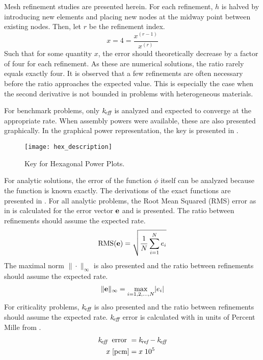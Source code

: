   Mesh refinement studies are presented herein. For each refinement, $h$ is 
  halved by introducing new elements and placing new nodes at the midway point
  between existing nodes. Then, let $r$ be the refinement index.
  \begin{equation}
    x = 4 = \frac{x^{(r-1)}}{x^{(r)}}
  \end{equation}
  Such that for some quantity $x$, the error should theoretically decrease by a
  factor of four for each refinement. As these are numerical solutions, the 
  ratio rarely equals exactly four. It is observed that a few refinements are 
  often necessary before the ratio approaches the expected value. This is 
  especially the case when the second derivative is not bounded in problems with 
  heterogeneous materials.
  
  For benchmark problems, only $k_{\!\mbox{\scriptsize \em eff}}$ is analyzed and expected to converge
  at the appropriate rate. When assembly powers were available, these are also
  presented graphically. In the graphical power representation, the key is 
  presented in .
  \begin{figure}
    \centering
    \texttt{[image: hex\_description]}
    \caption{Key for Hexagonal Power Plots.}
    \label{fig:hex_description}
  \end{figure}
  
  For analytic solutions, the error of the function $\phi$ itself can be 
  analyzed because the function is known exactly. The derivations of the exact 
  functions are presented in . For all analytic 
  problems, the Root Mean Squared (RMS) error as in  is calculated
  for the error vector $\mathbf{e}$ and is presented. The ratio between refinements 
  should assume the expected rate.
  \begin{equation} \label{eq:rms}
    \text{RMS}(\mathbf{e}) = \sqrt{\frac{1}{N} \sum_{i=1}^{N} e_i}
  \end{equation}
  The maximal norm $\| \cdot \|_{\infty}$ is also presented and the ratio 
  between refinements should assume the expected rate.
  \begin{equation} \label{eq:infnorm}
    \|\mathbf{e}\|_{\infty} = \max_{i=1,2,\ldots,N} \lvert e_i \rvert
  \end{equation}
  For criticality  problems, $k_{\!\mbox{\scriptsize \em eff}}$ is also presented and the ratio between
  refinements should assume the expected rate. $k_{\!\mbox{\scriptsize \em eff}}$ error is calculated with
   in units of Percent Mille  from .
  \begin{align}
    \label{eq:keff_err}
    k_{\!\mbox{\scriptsize \em eff}} \; \text{ error } &= k_{\!\mbox{\scriptsize \em ref}} - k_{\!\mbox{\scriptsize \em eff}} \\
    \label{eq:pcm}
    x \;\text{[{pcm}]} &= x \; 10^5
  \end{align}

